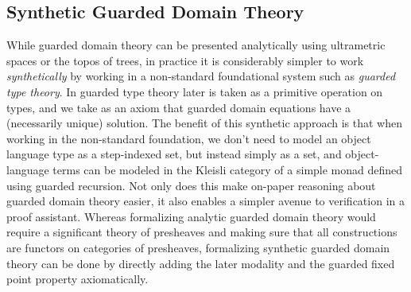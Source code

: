
\subsection{Synthetic Guarded Domain Theory}

While guarded domain theory can be presented analytically using
ultrametric spaces or the topos of trees, in practice it is
considerably simpler to work \emph{synthetically} by working in a
non-standard foundational system such as \emph{guarded type
theory}. In guarded type theory later is taken as a primitive
operation on types, and we take as an axiom that guarded domain
equations have a (necessarily unique) solution. The benefit of this
synthetic approach is that when working in the non-standard
foundation, we don't need to model an object language type as a
step-indexed set, but instead simply as a set, and object-language
terms can be modeled in the Kleisli category of a simple monad defined
using guarded recursion. Not only does this make on-paper reasoning
about guarded domain theory easier, it also enables a simpler avenue
to verification in a proof assistant. Whereas formalizing analytic
guarded domain theory would require a significant theory of presheaves
and making sure that all constructions are functors on categories of
presheaves, formalizing synthetic guarded domain theory can be done by
directly adding the later modality and the guarded fixed point
property axiomatically.
%

